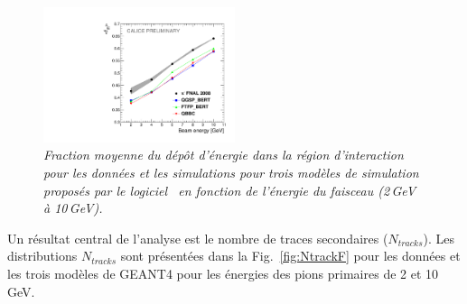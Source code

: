 \begin{figure}
	\centering
	\includegraphics[width=0.5\textwidth]{ECAL/plots/e-ir-graph.pdf}
	\caption{\label{fig:irgraphF} \sl  Fraction moyenne du dépôt d'énergie dans la région d'interaction pour les données et les simulations  pour trois modèles de simulation proposés par le logiciel \geant\ en fonction de l'énergie du faisceau (2\,GeV à 10\,GeV).}
\end{figure}



Un résultat central de l'analyse est le nombre de traces secondaires ($N_ {tracks}$). %
Les distributions $N_ {tracks}$ sont présentées dans la Fig.~\ref{fig:NtrackF} pour  les données et les trois modèles de GEANT4 pour les énergies des pions primaires de 2 et 10 GeV. 

